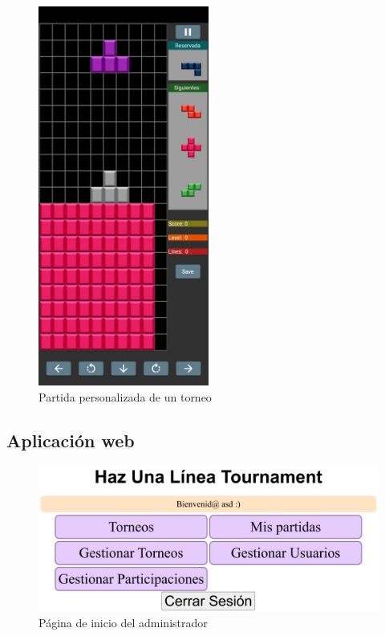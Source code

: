 \documentclass{article}
\begin{document}
\begin{figure}[H]
  \centering
  \includegraphics[width=0.5\textwidth]{imagenes/piezasRosas.jpeg}
  \caption{Partida personalizada de un torneo} 
\end{figure}

\subsection{Aplicación web}
\begin{figure}[H]
  \includegraphics[width=\textwidth]{imagenes/inicioAdmin.png}
  \caption{Página de inicio del administrador} 
\end{figure}
\end{document}
